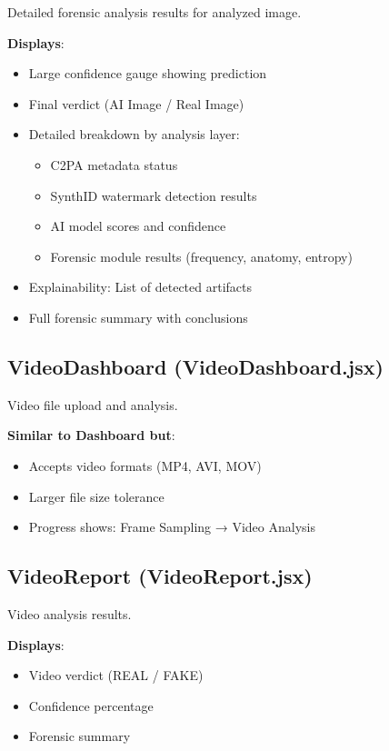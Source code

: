 \documentclass[12pt,a4paper]{book}
\begin{document}
\begin{itemize}
Detailed forensic analysis results for analyzed image.

\textbf{Displays}:
\begin{itemize}
    \item Large confidence gauge showing prediction
    \item Final verdict (AI Image / Real Image)
    \item Detailed breakdown by analysis layer:
    \begin{itemize}
        \item C2PA metadata status
        \item SynthID watermark detection results
        \item AI model scores and confidence
        \item Forensic module results (frequency, anatomy, entropy)
    \end{itemize}
    \item Explainability: List of detected artifacts
    \item Full forensic summary with conclusions
\end{itemize}

\subsection{VideoDashboard (VideoDashboard.jsx)}

Video file upload and analysis.

\textbf{Similar to Dashboard but}:
\begin{itemize}
    \item Accepts video formats (MP4, AVI, MOV)
    \item Larger file size tolerance
    \item Progress shows: Frame Sampling → Video Analysis
\end{itemize}

\subsection{VideoReport (VideoReport.jsx)}

Video analysis results.

\textbf{Displays}:
\begin{itemize}
    \item Video verdict (REAL / FAKE)
    \item Confidence percentage
    \item Forensic summary
\end{itemize}


\end{itemize}
\end{document}
